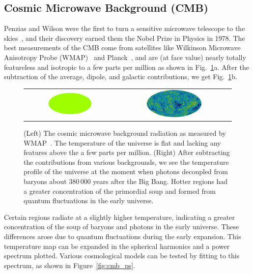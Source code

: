 \subsection{Cosmic Microwave Background (CMB)}

Penzias and Wilson were the first to turn a sensitive microwave telescope to the skies~\cite{Penzias:1965a,Penzias:1965b}, and their discovery earned them the Nobel Prize in Physics in 1978. The best measurements of the CMB come from satellites like Wilkinson Microwave Anisotropy Probe (WMAP)~\cite{Bennett:2012zja} and Planck~\cite{Ade:2015xua}, and are (at face value) nearly totally featureless and isotropic to a few parts per million as shown in Fig.~\ref{fig:cmb}a. After the subtraction of the average, dipole, and galactic contributions, we get Fig.~\ref{fig:cmb}b.

\begin{figure}[htb]
    \begin{tabular}{cc}
    \includegraphics[width=0.5\textwidth]{figures/dm/CMB0} & \includegraphics[width=0.5\textwidth]{figures/dm/CMB3} \\
    \end{tabular}
    \caption{(Left) The cosmic microwave background radiation as measured by WMAP~\cite{Bennett:2012zja}. The temperature of the universe is flat and lacking any features above the a few parts per million. (Right) After subtracting the contributions from various backgrounds, we see the temperature profile of the universe at the moment when photons decoupled from baryons about $380\,000$ years after the Big Bang. Hotter regions had a greater concentration of the primordial soup and formed from quantum fluctuations in the early universe.}\label{fig:cmb}
\end{figure}

Certain regions radiate at a slightly higher temperature, indicating a greater concentration of the soup of baryons and photons in the early universe. These differences arose due to quantum fluctuations during the early expansion. This temperature map can be expanded in the spherical harmonics and a power spectrum plotted. Various cosmological models can be tested by fitting to this spectrum, as shown in Figure~\ref{fig:cmb_ps}.

